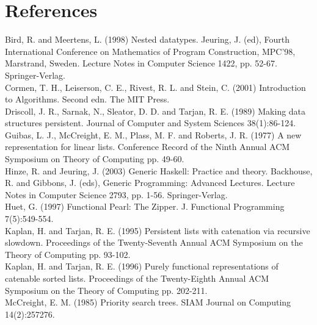 \documentclass[10pt]{article}
\begin{document}
\section*{References}
Bird, R. and Meertens, L. (1998) Nested datatypes. Jeuring, J. (ed), Fourth International Conference on Mathematics of Program Construction, MPC'98, Marstrand, Sweden. Lecture Notes in Computer Science 1422, pp. 52-67. Springer-Verlag.\\
Cormen, T. H., Leiserson, C. E., Rivest, R. L. and Stein, C. (2001) Introduction to Algorithms. Second edn. The MIT Press.\\
Driscoll, J. R., Sarnak, N., Sleator, D. D. and Tarjan, R. E. (1989) Making data structures persistent. Journal of Computer and System Sciences 38(1):86-124.\\
Guibas, L. J., McCreight, E. M., Plass, M. F. and Roberts, J. R. (1977) A new representation for linear lists. Conference Record of the Ninth Annual ACM Symposium on Theory of Computing pp. 49-60.\\
Hinze, R. and Jeuring, J. (2003) Generic Haskell: Practice and theory. Backhouse, R. and Gibbons, J. (eds), Generic Programming: Advanced Lectures. Lecture Notes in Computer Science 2793, pp. 1-56. Springer-Verlag.\\
Huet, G. (1997) Functional Pearl: The Zipper. J. Functional Programming 7(5):549-554.\\
Kaplan, H. and Tarjan, R. E. (1995) Persistent lists with catenation via recursive slowdown. Proceedings of the Twenty-Seventh Annual ACM Symposium on the Theory of Computing pp. 93-102.\\
Kaplan, H. and Tarjan, R. E. (1996) Purely functional representations of catenable sorted lists. Proceedings of the Twenty-Eighth Annual ACM Symposium on the Theory of Computing pp. 202-211.\\
McCreight, E. M. (1985) Priority search trees. SIAM Journal on Computing 14(2):257276.
\end{document}
